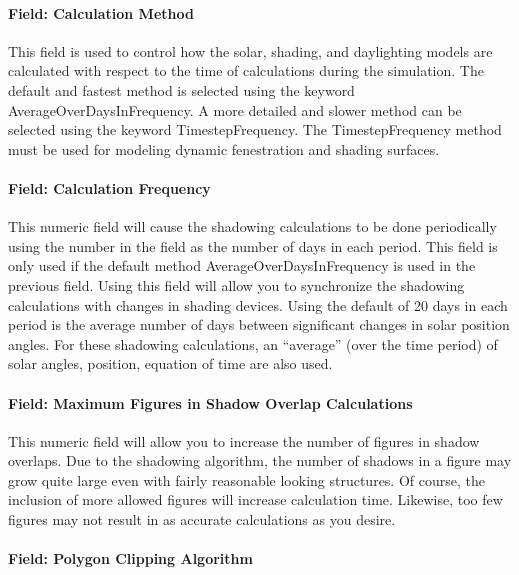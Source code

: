 \paragraph{Field: Calculation Method}\label{field-calculation-method-000}

This field is used to control how the solar, shading, and daylighting models are calculated with respect to the time of calculations during the simulation. The default and fastest method is selected using the keyword AverageOverDaysInFrequency. A more detailed and slower method can be selected using the keyword TimestepFrequency. The TimestepFrequency method must be used for modeling dynamic fenestration and shading surfaces.

\paragraph{Field: Calculation Frequency}\label{field-calculation-frequency}

This numeric field will cause the shadowing calculations to be done periodically using the number in the field as the number of days in each period. This field is only used if the default method AverageOverDaysInFrequency is used in the previous field. Using this field will allow you to synchronize the shadowing calculations with changes in shading devices. Using the default of 20 days in each period is the average number of days between significant changes in solar position angles. For these shadowing calculations, an ``average'' (over the time period) of solar angles, position, equation of time are also used.

\paragraph{Field: Maximum Figures in Shadow Overlap Calculations}\label{field-maximum-figures-in-shadow-overlap-calculations}

This numeric field will allow you to increase the number of figures in shadow overlaps. Due to the shadowing algorithm, the number of shadows in a figure may grow quite large even with fairly reasonable looking structures. Of course, the inclusion of more allowed figures will increase calculation time. Likewise, too few figures may not result in as accurate calculations as you desire.

\paragraph{Field: Polygon Clipping Algorithm}\label{field-polygon-clipping-algorithm}

